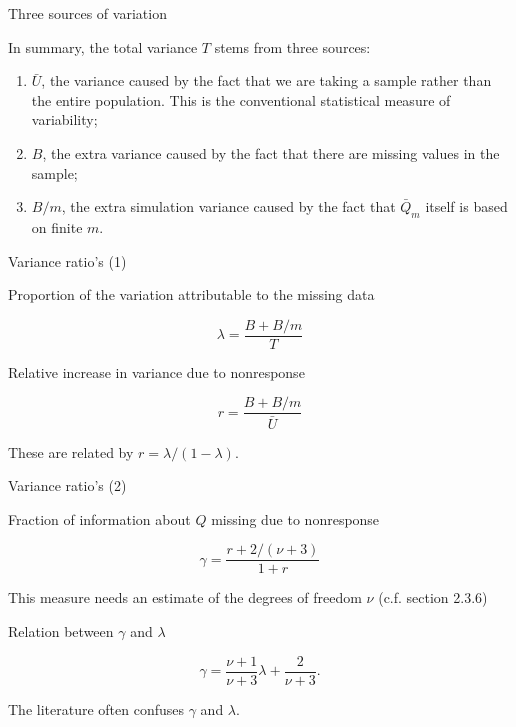 \documentclass[ignorenonframetext,aspectratio=43]{beamer}
\providecommand{\tightlist}{%
  \setlength{\itemsep}{0pt}\setlength{\parskip}{0pt}}
\begin{document}
\begin{frame}{Three sources of variation}
\protect\hypertarget{three-sources-of-variation}{}

In summary, the total variance \(T\) stems from three sources:

\begin{enumerate}
\tightlist
\item
  \(\bar U\), the variance caused by the fact that we are taking a
  sample rather than the entire population. This is the conventional
  statistical measure of variability;
\item
  \(B\), the extra variance caused by the fact that there are missing
  values in the sample;
\item
  \(B/m\), the extra simulation variance caused by the fact that
  \(\bar Q_m\) itself is based on finite \(m\).
\end{enumerate}

\end{frame}

\begin{frame}{Variance ratio's (1)}
\protect\hypertarget{variance-ratios-1}{}

Proportion of the variation attributable to the missing data

\[
  \lambda = \frac{B+B/m}{T}
\]

Relative increase in variance due to nonresponse

\[
  r = \frac{B+B/m}{\bar U}
\]

These are related by \(r = \lambda/(1-\lambda)\).

\end{frame}

\begin{frame}{Variance ratio's (2)}
\protect\hypertarget{variance-ratios-2}{}

Fraction of information about \(Q\) missing due to nonresponse

\[
\gamma = \frac{r+2/(\nu+3)}{1+r}\label{eq:gammama}
\]

This measure needs an estimate of the degrees of freedom \(\nu\) (c.f.
section 2.3.6)

Relation between \(\gamma\) and \(\lambda\)

\[
\gamma = \frac{\nu+1}{\nu+3}\lambda+\frac{2}{\nu+3}.\label{eq:gammamb}
\]

The literature often confuses \(\gamma\) and \(\lambda\).

\end{frame}
\end{document}
